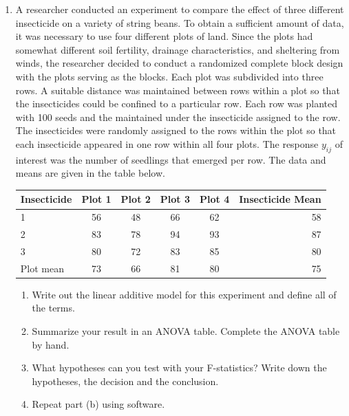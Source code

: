 \documentclass[12pt]{article}
\begin{document}
\begin{enumerate}
\begin{center}
\begin{tabular}{ccccccccccc}
\end{tabular}
\end{center}
The following summary statistics were calculated from these data:\\
$\sum_{i=1}^{10}x_i=649,\sum_{i=1}^{10}y_i=1642,\sum_{i=1}^{10}x^2_i=43575,\sum_{i=1}^{10}y^2_i=347648,\sum_{i=1}^{10}x_i y_i=96515, S_{xx}=\sum_{i=1}^{n}(x_i-\bar{x})^2=1454.9,S_{yy}=\sum_{i=1}^{n}(y_i-\bar{y})^2=78031.6,S_{xy}=\sum_{i=1}^{n}(x_i-\bar{x})(y_i-\bar{y})=-10050.8$.
\begin{enumerate}
\item Estimate the slope coefficient.
\item Estimate the intercept.
\item Test the $H_0:\beta_1=0$ versus $H_a:\beta_1\neq 0$ at the $\alpha=0.05$ level.
\item What can the researcher conclude?
\end{enumerate}
\item A researcher conducted an experiment to compare the effect of three different insecticide on a variety of string beans. To obtain a sufficient amount of data, it was necessary to use four different plots of land. Since the plots had somewhat different soil fertility, drainage characteristics, and sheltering from winds, the researcher decided to conduct a randomized complete block design with the plots serving as the blocks. Each plot was subdivided into three rows. A suitable distance was maintained between rows within a plot so that the insecticides could be confined to a particular row. Each row was planted with 100 seeds and the maintained under the insecticide assigned to the row. The insecticides were randomly assigned to the rows within the plot so that each insecticide appeared in one row within all four plots. The response $y_{ij}$ of interest was the number of seedlings that emerged per row. The data and means are given in the table below. \\
\begin{center}
\begin{tabular}{l|cccc|r} \hline
Insecticide & Plot 1 & Plot 2 & Plot 3 & Plot 4 & Insecticide Mean \\ \hline
1&56&48&66&62&58\\
2&83&78&94&93&87\\
3&80&72&83&85&80\\ \hline
Plot mean & 73&66&81&80&75
\end{tabular}
\end{center}
\begin{enumerate}
\item Write out the linear additive model for this experiment and define all of the terms.
\item Summarize your result in an ANOVA table. Complete the ANOVA table by hand.
\item What hypotheses can you test with your F-statistics? Write down the hypotheses, the decision and the conclusion.
\item Repeat part (b) using software.
\end{enumerate}
\end{enumerate}
\end{document}
